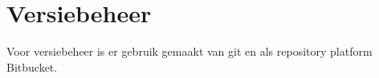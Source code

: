 \section{Versiebeheer}
Voor versiebeheer is er gebruik gemaakt van git en als repository platform Bitbucket.

